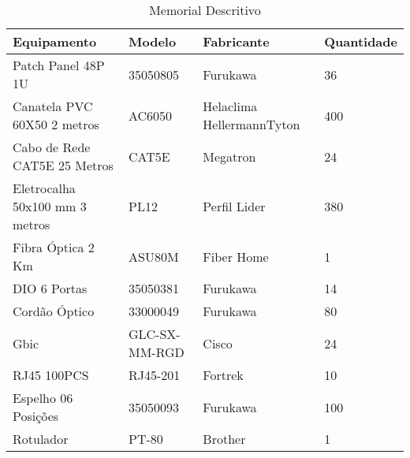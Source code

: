 \begin{table}[h!] %
\centering
\caption{Memorial Descritivo}
\label{tab7} %
\begin{tabular}{|l|l|l|l|}
\hline
Equipamento                    & Modelo        & Fabricante                & Quantidade \\ \hline
Patch Panel 48P 1U             & 35050805      & Furukawa                  & 36         \\ \hline
Canatela PVC 60X50 2 metros    & AC6050        & Helaclima HellermannTyton & 400        \\ \hline
Cabo de Rede CAT5E 25 Metros   & CAT5E         & Megatron                  & 24         \\ \hline
Eletrocalha 50x100 mm 3 metros & PL12          & Perfil Lider              & 380        \\ \hline
Fibra Óptica 2 Km              & ASU80M        & Fiber Home                & 1          \\ \hline
DIO 6 Portas                   & 35050381      & Furukawa                  & 14         \\ \hline
Cordão Óptico                  & 33000049      & Furukawa                  & 80         \\ \hline
Gbic                           & GLC-SX-MM-RGD & Cisco                     & 24         \\ \hline
RJ45 100PCS                    & RJ45-201      & Fortrek                   & 10         \\ \hline
Espelho 06 Posições            & 35050093      & Furukawa                  & 100        \\ \hline
Rotulador                      & PT-80         & Brother                   & 1          \\ \hline
\end{tabular}
\end{table}